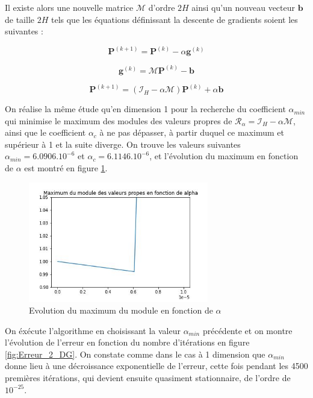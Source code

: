 \documentclass[12pt]{report}
\begin{document}
Il existe alors une nouvelle matrice $\mathcal{M}$ d'ordre $2H$ ainsi qu'un nouveau vecteur $\bm{b}$ de taille $2H$ tels que les équations définissant la descente de gradients soient les suivantes :

\begin{equation}
    \bm{P}^{(k+1)} = \bm{P}^{(k)} - \alpha\bm{g}^{(k)} 
\label{eq:équation récurrence descente gradients 2D}
\end{equation}

\begin{equation}
    \bm{g}^{(k)} = \mathcal{M}\bm{P}^{(k)} - \bm{b}
\label{eq:expression matricielle gradient 2D}
\end{equation}

\begin{equation}
    \bm{P}^{(k+1)} = (\mathcal{I}_H - \alpha \mathcal{M} )  \bm{P}^{(k)} + \alpha\bm{b}
\label{eq:équation récurrence descente gradients v2 2D}
\end{equation}

On réalise la même étude qu'en dimension 1 pour la recherche du coefficient $\alpha_{min}$ qui minimise le maximum des modules des valeurs propres de $\mathcal{R}_\alpha = \mathcal{I}_H - \alpha \mathcal{M}$, ainsi que le coefficient $\alpha_c$ à ne pas dépasser, à partir duquel ce maximum et supérieur à 1 et la suite diverge.
On trouve les valeurs suivantes $\alpha_{min} = 6.0906.10^{-6}$ et $\alpha_c = 6.1146.10^{-6}$,  et l'évolution du maximum en fonction de $\alpha$ est montré en figure \ref{fig:choix_alpha_2D}.


\begin{figure}
    \centering
    \includegraphics[width=0.7\textwidth]{choix_alpha_2D.jpg}
    \caption{\label{fig:choix_alpha_2D}Evolution du maximum du module en fonction de $\alpha$}
\end{figure}

On éxécute l'algorithme en choisissant la valeur $\alpha_{min}$ précédente et on montre l'évolution de l'erreur en fonction du nombre d'itérations en figure \ref{fig:Erreur_2_DG}. 
On constate comme dans le cas à 1 dimension que $\alpha_{min}$ donne lieu à une décroissance exponentielle de l'erreur, cette fois pendant les 4500 premières itérations, qui devient ensuite quasiment stationnaire, de l'ordre de $10^{-25}$.
\end{document}
